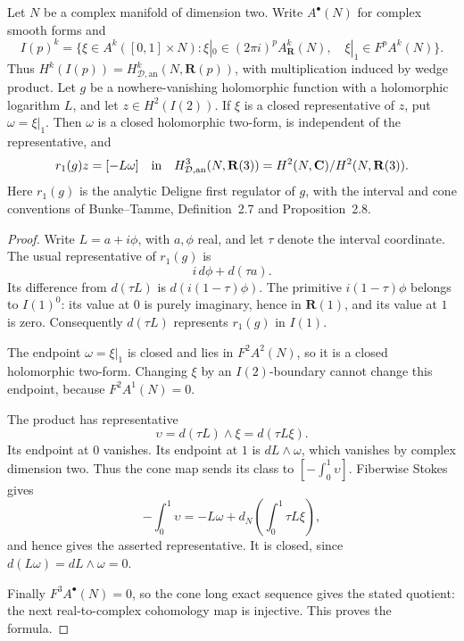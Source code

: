 
\begin{lemma}
Let $N$ be a complex manifold of dimension two. Write $A^\bullet(N)$
for complex smooth forms and
\[
 I(p)^k=\{\xi\in A^k([0,1]\times N):
 \xi|_0\in (2\pi i)^pA^k_{\mathbf R}(N),\quad
 \xi|_1\in F^pA^k(N)\}.
\]
Thus $H^k(I(p))=H^k_{\mathcal D,\mathrm{an}}(N,\mathbf R(p))$,
with multiplication induced by wedge product.
Let $g$ be a nowhere-vanishing holomorphic function with a holomorphic
logarithm $L$, and let $z\in H^2(I(2))$. If $\xi$ is a closed
representative of $z$, put $\omega=\xi|_1$. Then $\omega$ is a
closed holomorphic two-form, is independent of the representative,
and
\[
 r_1(g)z=[-L\omega]\quad\hbox{in}\quad
 H^3_{\mathcal D,\mathrm{an}}(N,\mathbf R(3))
 =H^2(N,\mathbf C)/H^2(N,\mathbf R(3)).
\]
Here $r_1(g)$ is the analytic Deligne first regulator of $g$, with
the interval and cone conventions of Bunke--Tamme,
Definition~2.7 and Proposition~2.8.
\end{lemma}

\begin{proof}
Write $L=a+i\phi$, with $a,\phi$ real, and let $\tau$ denote the
interval coordinate. The usual representative of $r_1(g)$ is
\[
 i\,d\phi+d(\tau a).
\]
Its difference from $d(\tau L)$ is
$d(i(1-\tau)\phi)$. The primitive $i(1-\tau)\phi$ belongs to
$I(1)^0$: its value at $0$ is purely imaginary, hence in
$\mathbf R(1)$, and its value at $1$ is zero. Consequently
$d(\tau L)$ represents $r_1(g)$ in $I(1)$.

The endpoint $\omega=\xi|_1$ is closed and lies in $F^2A^2(N)$,
so it is a closed holomorphic two-form. Changing $\xi$ by an
$I(2)$-boundary cannot change this endpoint, because
$F^2A^1(N)=0$.

The product has representative
\[
 \upsilon=d(\tau L)\wedge\xi=d(\tau L\xi).
\]
Its endpoint at $0$ vanishes. Its endpoint at $1$ is
$dL\wedge\omega$, which vanishes by complex dimension two.
Thus the cone map sends its class to
$[-\int_0^1\upsilon]$. Fiberwise Stokes gives
\[
 -\int_0^1\upsilon
 =-L\omega+d_N\!\left(\int_0^1\tau L\xi\right),
\]
and hence gives the asserted representative. It is closed, since
$d(L\omega)=dL\wedge\omega=0$.

Finally $F^3A^\bullet(N)=0$, so the cone long exact sequence gives
the stated quotient: the next real-to-complex cohomology map is
injective. This proves the formula.
\end{proof}

